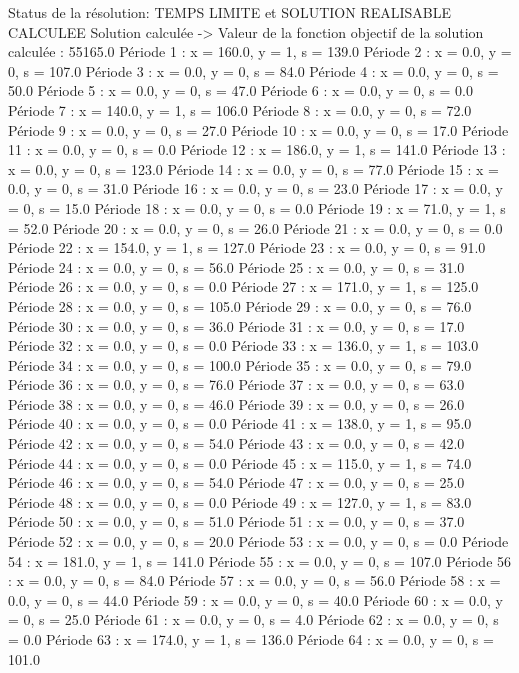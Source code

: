 Status de la résolution: TEMPS LIMITE et SOLUTION REALISABLE CALCULEE
Solution calculée
-> Valeur de la fonction objectif de la solution calculée :  55165.0
Période 1 : x = 160.0, y = 1, s = 139.0
Période 2 : x = 0.0, y = 0, s = 107.0
Période 3 : x = 0.0, y = 0, s = 84.0
Période 4 : x = 0.0, y = 0, s = 50.0
Période 5 : x = 0.0, y = 0, s = 47.0
Période 6 : x = 0.0, y = 0, s = 0.0
Période 7 : x = 140.0, y = 1, s = 106.0
Période 8 : x = 0.0, y = 0, s = 72.0
Période 9 : x = 0.0, y = 0, s = 27.0
Période 10 : x = 0.0, y = 0, s = 17.0
Période 11 : x = 0.0, y = 0, s = 0.0
Période 12 : x = 186.0, y = 1, s = 141.0
Période 13 : x = 0.0, y = 0, s = 123.0
Période 14 : x = 0.0, y = 0, s = 77.0
Période 15 : x = 0.0, y = 0, s = 31.0
Période 16 : x = 0.0, y = 0, s = 23.0
Période 17 : x = 0.0, y = 0, s = 15.0
Période 18 : x = 0.0, y = 0, s = 0.0
Période 19 : x = 71.0, y = 1, s = 52.0
Période 20 : x = 0.0, y = 0, s = 26.0
Période 21 : x = 0.0, y = 0, s = 0.0
Période 22 : x = 154.0, y = 1, s = 127.0
Période 23 : x = 0.0, y = 0, s = 91.0
Période 24 : x = 0.0, y = 0, s = 56.0
Période 25 : x = 0.0, y = 0, s = 31.0
Période 26 : x = 0.0, y = 0, s = 0.0
Période 27 : x = 171.0, y = 1, s = 125.0
Période 28 : x = 0.0, y = 0, s = 105.0
Période 29 : x = 0.0, y = 0, s = 76.0
Période 30 : x = 0.0, y = 0, s = 36.0
Période 31 : x = 0.0, y = 0, s = 17.0
Période 32 : x = 0.0, y = 0, s = 0.0
Période 33 : x = 136.0, y = 1, s = 103.0
Période 34 : x = 0.0, y = 0, s = 100.0
Période 35 : x = 0.0, y = 0, s = 79.0
Période 36 : x = 0.0, y = 0, s = 76.0
Période 37 : x = 0.0, y = 0, s = 63.0
Période 38 : x = 0.0, y = 0, s = 46.0
Période 39 : x = 0.0, y = 0, s = 26.0
Période 40 : x = 0.0, y = 0, s = 0.0
Période 41 : x = 138.0, y = 1, s = 95.0
Période 42 : x = 0.0, y = 0, s = 54.0
Période 43 : x = 0.0, y = 0, s = 42.0
Période 44 : x = 0.0, y = 0, s = 0.0
Période 45 : x = 115.0, y = 1, s = 74.0
Période 46 : x = 0.0, y = 0, s = 54.0
Période 47 : x = 0.0, y = 0, s = 25.0
Période 48 : x = 0.0, y = 0, s = 0.0
Période 49 : x = 127.0, y = 1, s = 83.0
Période 50 : x = 0.0, y = 0, s = 51.0
Période 51 : x = 0.0, y = 0, s = 37.0
Période 52 : x = 0.0, y = 0, s = 20.0
Période 53 : x = 0.0, y = 0, s = 0.0
Période 54 : x = 181.0, y = 1, s = 141.0
Période 55 : x = 0.0, y = 0, s = 107.0
Période 56 : x = 0.0, y = 0, s = 84.0
Période 57 : x = 0.0, y = 0, s = 56.0
Période 58 : x = 0.0, y = 0, s = 44.0
Période 59 : x = 0.0, y = 0, s = 40.0
Période 60 : x = 0.0, y = 0, s = 25.0
Période 61 : x = 0.0, y = 0, s = 4.0
Période 62 : x = 0.0, y = 0, s = 0.0
Période 63 : x = 174.0, y = 1, s = 136.0
Période 64 : x = 0.0, y = 0, s = 101.0
